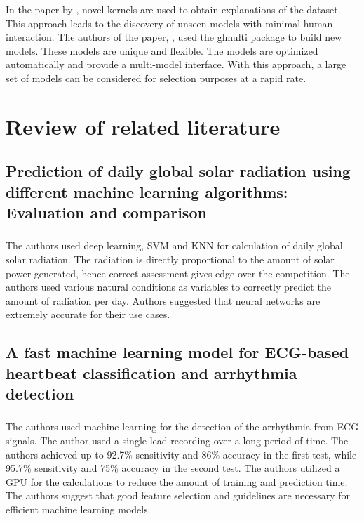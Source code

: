In the paper by \cite{ref_paper_44}, novel kernels are used to obtain explanations of the dataset. This approach leads to the discovery of unseen models with minimal human interaction. The authors of the paper, \cite{ref_paper_45}, used the glmulti package to build new models. These models are unique and flexible. The models are optimized automatically and provide a multi-model interface. With this approach, a large set of models can be considered for selection purposes at a rapid rate.

\section{Review of related literature}\label{sec:review_of_related_literature}

\subsection{Prediction of daily global solar radiation using different machine learning algorithms: Evaluation and comparison}
\subsubsection{\citeauthor*{ref_paper_7} \citeyearpar{ref_paper_7}}

The authors used deep learning, SVM and KNN for calculation of daily global solar radiation. The radiation is directly proportional to the amount of solar power generated, hence correct assessment gives edge over the competition. The authors used various natural conditions as variables to correctly predict the amount of radiation per day. Authors suggested that neural networks are extremely accurate for their use cases.

\subsection{A fast machine learning model for ECG-based heartbeat classification and arrhythmia detection}
\subsubsection{\citeauthor*{ref_paper_28} \citeyearpar{ref_paper_28}}

The authors used machine learning for the detection of the arrhythmia from ECG signals. The author used a single lead recording over a long period of time. The authors achieved up to 92.7\% sensitivity and 86\% accuracy in the first test, while 95.7\% sensitivity and 75\% accuracy in the second test. The authors utilized a GPU for the calculations to reduce the amount of training and prediction time. The authors suggest that good feature selection and guidelines are necessary for efficient machine learning models.

